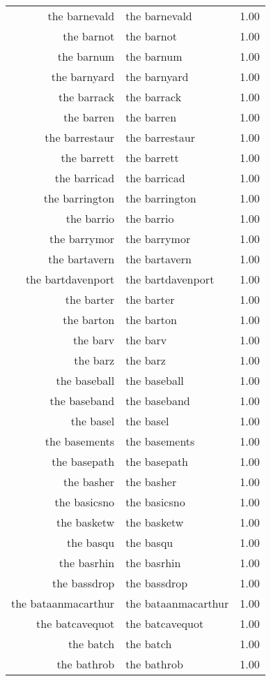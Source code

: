 \begin{table}[ht]
\begin{tabular}{rlr}
  the barnevald & the barnevald & 1.00 \\ 
  the barnot & the barnot & 1.00 \\ 
  the barnum & the barnum & 1.00 \\ 
  the barnyard & the barnyard & 1.00 \\ 
  the barrack & the barrack & 1.00 \\ 
  the barren & the barren & 1.00 \\ 
  the barrestaur & the barrestaur & 1.00 \\ 
  the barrett & the barrett & 1.00 \\ 
  the barricad & the barricad & 1.00 \\ 
  the barrington & the barrington & 1.00 \\ 
  the barrio & the barrio & 1.00 \\ 
  the barrymor & the barrymor & 1.00 \\ 
  the bartavern & the bartavern & 1.00 \\ 
  the bartdavenport & the bartdavenport & 1.00 \\ 
  the barter & the barter & 1.00 \\ 
  the barton & the barton & 1.00 \\ 
  the barv & the barv & 1.00 \\ 
  the barz & the barz & 1.00 \\ 
  the baseball & the baseball & 1.00 \\ 
  the baseband & the baseband & 1.00 \\ 
  the basel & the basel & 1.00 \\ 
  the basements & the basements & 1.00 \\ 
  the basepath & the basepath & 1.00 \\ 
  the basher & the basher & 1.00 \\ 
  the basicsno & the basicsno & 1.00 \\ 
  the basketw & the basketw & 1.00 \\ 
  the basqu & the basqu & 1.00 \\ 
  the basrhin & the basrhin & 1.00 \\ 
  the bassdrop & the bassdrop & 1.00 \\ 
  the bataanmacarthur & the bataanmacarthur & 1.00 \\ 
  the batcavequot & the batcavequot & 1.00 \\ 
  the batch & the batch & 1.00 \\ 
  the bathrob & the bathrob & 1.00 \\ 

\end{tabular}
\end{table}
